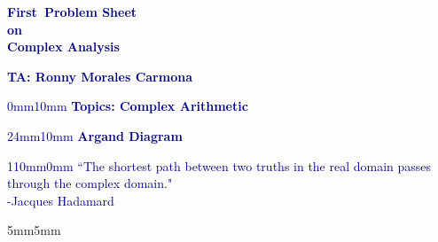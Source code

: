 \documentclass[11pt]{report} %
\newcommand{\card}{First} %
\newcommand{\course}{Complex Analysis} %
\newcommand{\phrase}{The shortest path between two truths in the real domain passes through the complex domain.} %
\newcommand{\authorp}{Jacques Hadamard} %
\begin{document}
\setlength{\paperwidth}{595pt} %
\setlength{\paperheight}{841pt} %
\textcolor{navy}{\begin{flushright}
    {\Huge \textbf{\card\ Problem Sheet}}\\ [5pt]
    {\LARGE \textbf{on}}\\ [5pt]
    {\LARGE \textbf{\course}}\\ [30pt]
\end{flushright}
    {\LARGE \textbf{TA: Ronny Morales Carmona}} \vspace{-2pt}
\begin{adjustwidth}{0mm}{10mm}
    {\LARGE \textbf{Topics: Complex Arithmetic}}
\end{adjustwidth} \vspace{-4pt}
\begin{adjustwidth}{24mm}{10mm}
    {\LARGE \textbf{Argand Diagram}}
\end{adjustwidth} \vspace{-4pt}
\begin{adjustwidth}{110mm}{0mm}
        \textsf{\large “\phrase"\\ [2pt]
                       -\authorp}
    \end{adjustwidth}}

\vspace{10pt}
\begin{adjustwidth}{5mm}{5mm} \fontsize{11pt}{0pt}





\end{adjustwidth}
\end{document}
